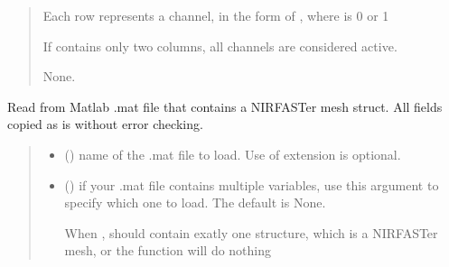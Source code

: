 \documentclass[letterpaper,10pt,english]{sphinxmanual}
\begin{document}
\begin{fulllineitems}
\begin{fulllineitems}
\begin{quote}
\begin{description}
\begin{itemize}
\sphinxAtStartPar
Each row represents a channel, in the form of , where  is 0 or 1

\sphinxAtStartPar
If  contains only two columns, all channels are considered active.


\end{itemize}

\sphinxAtStartPar
None.

\end{description}\end{quote}

\end{fulllineitems}


\begin{fulllineitems}
\label{\detokenize{_autosummary/nirfasterff.base.stnd_mesh.stndmesh:nirfasterff.base.stnd_mesh.stndmesh.from_mat}}
\pysigstartsignatures
{}
\pysigstopsignatures
\sphinxAtStartPar
Read from Matlab .mat file that contains a NIRFASTer mesh struct. All fields copied as is without error checking.
\begin{quote}\begin{description}
\begin{itemize}
\item {} 
\sphinxAtStartPar
{} () \textendash{} name of the .mat file to load. Use of extension is optional.

\item {} 
\sphinxAtStartPar
{} (\sphinxstyleliteralemphasis{\sphinxupquote{, }}) \textendash{} 
\sphinxAtStartPar
if your .mat file contains multiple variables, use this argument to specify which one to load. The default is None.

\sphinxAtStartPar
When ,  should contain exatly one structure, which is a NIRFASTer mesh, or the function will do nothing



\end{itemize}
\end{description}
\end{quote}
\end{fulllineitems}
\end{fulllineitems}
\end{document}
